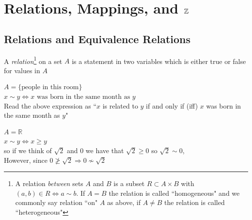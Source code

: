 


\chapter{\texorpdfstring{Relations, Mappings, and ${\mathbb{ Z}}$}{Relations, Mappings, and Z (integers)}}
\vspace{-0.1in}
\section{Relations and Equivalence Relations}
\begin{definition}[Relations]
A \textit{relation}\footnote{
    A relation \textit{between} sets $A$ and $B$ is a subset $R\subset A\times B$ with $(a,b)\in R \iff a\sim b $. If $A=B$ the relation is called ``homogeneous" and we commonly say relation ``on" $A$ as above, if $A\neq B$ the relation is called ``heterogeneous"
} on a set $A$ is a statement in two variables which is either true or false for values in $A$
\end{definition}
\begin{example}
$A=\{\text{people in this room}\}$\\
$x\sim y \Leftrightarrow x \text{ was born in the same month as } y$\\
Read the above expression as ``$x$ is related to $y$ if and only if (iff) $x$ was born in the same month as $y$"
\end{example}
\begin{example}
$A=\mathbb{R}$\\
$x\sim y \Leftrightarrow x \geq y$\\
so if we think of $\sqrt{2}$ and $0$ we have that $\sqrt{2}\geq 0$ so $\sqrt{2}\sim 0$, \\
However, since $0 \not\geq \sqrt{2} \Rightarrow 0\not\sim \sqrt{2}$
\end{example}
